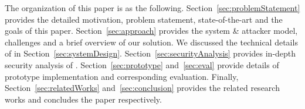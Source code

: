  The organization of this paper is as the following. Section~\ref{sec:problemStatement} provides the detailed motivation, problem statement, state-of-the-art and the goals of this paper. Section~\ref{sec:approach} provides the system \& attacker model, challenges and a brief overview of our solution. We discussed the technical details of \name in Section~\ref{sec:systemDesign}. Section~\ref{sec:securityAnalysis} provides in-depth security analysis of \name. Section~\ref{sec:prototype} and~\ref{sec:eval} provide details of \name prototype implementation and corresponding evaluation. Finally, Section~\ref{sec:relatedWorks} and~\ref{sec:conclusion} provides the related research works and concludes the paper respectively.




 